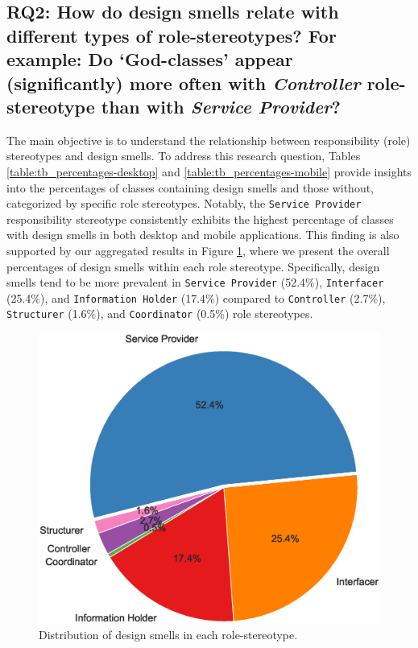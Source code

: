 \documentclass[AMA,Times1COL]{WileyNJDv5} %
\begin{document}
	
	\subsection*{RQ2: How do design smells relate with different types of role-stereotypes? For example: Do `God-classes’ appear (significantly) more often with \textit{Controller} role-stereotype than with \textit{Service Provider}?}
	The main objective is to understand the relationship between responsibility (role) stereotypes and design smells. To address this research question, Tables \ref{table:tb_percentages-desktop} and \ref{table:tb_percentages-mobile} provide insights into the percentages of classes containing design smells and those without, categorized by specific role stereotypes. Notably, the {\tt Service Provider} responsibility stereotype consistently exhibits the highest percentage of classes with design smells in both desktop and mobile applications. This finding is also supported by our aggregated results in Figure \ref{fig:pie_chart_percentages}, where we present the overall percentages of design smells within each role stereotype. Specifically, design smells tend to be more prevalent in {\tt Service Provider} (52.4\%), {\tt Interfacer} (25.4\%), and {\tt Information Holder} (17.4\%) compared to {\tt Controller} (2.7\%), {\tt Structurer} (1.6\%), and {\tt Coordinator} (0.5\%) role stereotypes.
	
	\begin{figure}[!h]
		\centering
		\includegraphics[scale=0.4]{figures/piechart_plot.eps}
		\caption{Distribution of design smells in each role-stereotype.}
		\label{fig:pie_chart_percentages}
	\end{figure}
\end{document}
